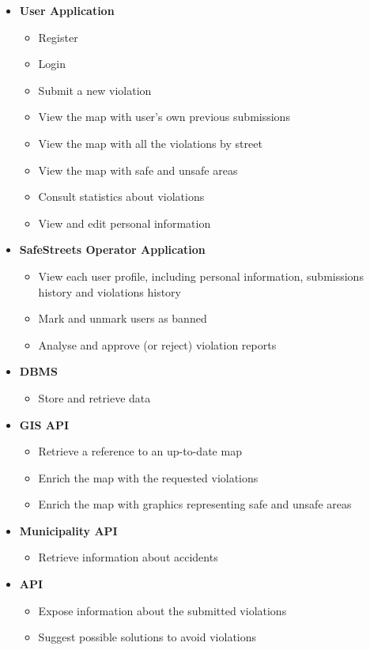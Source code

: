 \begin{itemize}

	\item \textbf{User Application}
	\begin{itemize}
		\item Register
		\item Login
		\item Submit a new violation
		\item View the map with user's own previous submissions
		\item View the map with all the violations by street
		\item View the map with safe and unsafe areas
		\item Consult statistics about violations
		\item View and edit personal information
	\end{itemize}
	\clearpage
	\item \textbf{SafeStreets Operator Application}
	\begin{itemize}
		\item View each user profile, including personal information, submissions history and violations history
		\item Mark and unmark users as banned
		\item Analyse and approve (or reject) violation reports
	\end{itemize}
	
	\item \textbf{DBMS}
	\begin{itemize}
		\item Store and retrieve data
	\end{itemize}	
	
	\item \textbf{GIS API}
	\begin{itemize}
		\item Retrieve a reference to an up-to-date map
		\item Enrich the map with the requested violations
		\item Enrich the map with graphics representing safe and unsafe areas
	\end{itemize}
	
	\item \textbf{Municipality API}
	\begin{itemize}
		\item Retrieve information about accidents
	\end{itemize}
	
	\item \textbf{API}
	\begin{itemize}
		\item Expose information about the submitted violations
		\item Suggest possible solutions to avoid violations
	\end{itemize}
\end{itemize}
\clearpage

